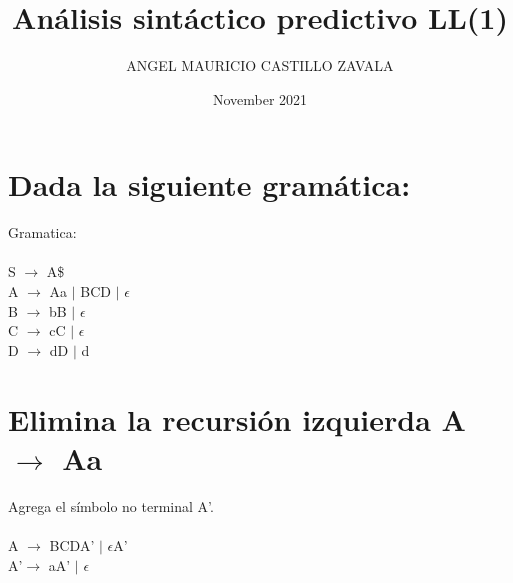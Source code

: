\documentclass[10pt]{article}
\title{Análisis sintáctico predictivo LL(1)}
\author{ANGEL MAURICIO CASTILLO ZAVALA}
\date{November 2021}
\begin{document}
\maketitle

\section{Dada la siguiente gramática: }
Gramatica: \\\\
    S {$\rightarrow$} A\$ \\
	A {$\rightarrow$}  Aa $\mid$ BCD $\mid$ $\epsilon$ \\
	B {$\rightarrow$} bB $\mid$ $\epsilon$ \\
	C {$\rightarrow$} cC $\mid$ $\epsilon$\\
	D {$\rightarrow$} dD $\mid$ d

\section{Elimina la recursión izquierda A $\rightarrow$ Aa}
Agrega el símbolo no terminal A’.\\\\
           A $\rightarrow$ BCDA' $\mid$ $\epsilon$A'\\
          A’$\rightarrow$ aA' $\mid$ $\epsilon$ \\
\end{document}
